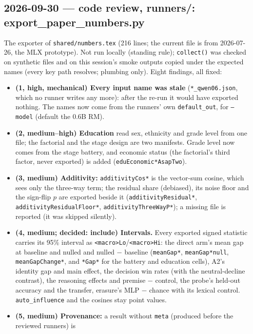 \documentclass{article}
\begin{document}
\subsection*{2026-09-30 --- code review, runners/: export\_paper\_numbers.py}
The exporter of \texttt{shared/numbers.tex} (216 lines; the current file is from 2026-07-26, the MLX prototype). Not
run locally (standing rule); \texttt{collect()} was checked on synthetic files and on this session's smoke outputs
copied under the expected names (every key path resolves; plumbing only). Eight findings, all fixed:
\begin{itemize}
  \item \textbf{(1, high, mechanical) Every input name was stale} (\texttt{*\_qwen06.json}, which no runner writes
        any more): after the re-run it would have exported nothing. The names now come from the runners' own
        \texttt{default\_out}, for \texttt{--model} (default the 0.6B RM).
  \item \textbf{(2, medium--high) Education} read sex, ethnicity and grade level from one file; the factorial and
        the stage design are two manifests. Grade level now comes from the stage battery, and economic status (the
        factorial's third factor, never exported) is added (\texttt{eduEconomic*AsapTwo}).
  \item \textbf{(3, medium) Additivity:} \texttt{additivityCos*} is the vector-sum cosine, which sees only the
        three-way term; the residual share (debiased), its noise floor and the sign-flip $p$ are exported beside it
        (\texttt{additivityResidual*}, \texttt{additivityResidualFloor*}, \texttt{additivityThreeWayP*}); a missing
        file is reported (it was skipped silently).
  \item \textbf{(4, medium; decided: include) Intervals.} Every exported signed statistic carries its 95\%
        interval as \texttt{<macro>Lo}/\texttt{<macro>Hi}: the direct arm's mean gap at baseline and nulled and
        nulled $-$ baseline (\texttt{meanGap*}, \texttt{meanGap*null}, \texttt{meanGapChange*}, and \texttt{*Gap*} for
        the battery and education cells), A2's identity gap and main effect, the decision win rates (with the
        neutral-decline contrast), the reasoning effects and premise $-$ control, the probe's held-out accuracy
        and the transfer, erasure's MLP $-$ chance with its lexical control. \texttt{auto\_influence} and the cosines
        stay point values.
  \item \textbf{(5, medium) Provenance:} a result without \texttt{meta} (produced before the reviewed runners) is

\end{itemize}
\end{document}
